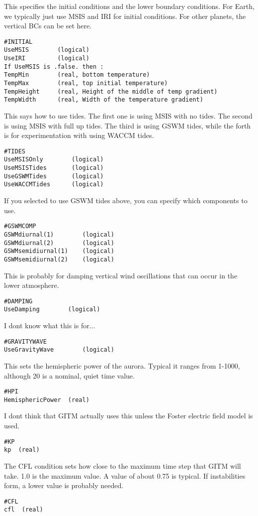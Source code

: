 This specifies the initial conditions and the
lower boundary conditions.  For Earth, we typically
just use MSIS and IRI for initial conditions.
For other planets, the vertical BCs can be set here.
\begin{verbatim}
#INITIAL
UseMSIS        (logical)
UseIRI         (logical)
If UseMSIS is .false. then :
TempMin        (real, bottom temperature)
TempMax        (real, top initial temperature)
TempHeight     (real, Height of the middle of temp gradient)
TempWidth      (real, Width of the temperature gradient)
\end{verbatim}

This says how to use tides.  The first one is using
MSIS with no tides.  The second is using MSIS with
full up tides. The third is using GSWM tides, while
the forth is for experimentation with using WACCM
tides.
\begin{verbatim}
#TIDES
UseMSISOnly        (logical)
UseMSISTides       (logical)
UseGSWMTides       (logical)
UseWACCMTides      (logical)
\end{verbatim}

If you selected to use GSWM tides above, you
can specify which components to use.
\begin{verbatim}
#GSWMCOMP
GSWMdiurnal(1)        (logical)
GSWMdiurnal(2)        (logical)
GSWMsemidiurnal(1)    (logical)
GSWMsemidiurnal(2)    (logical)
\end{verbatim}

This is probably for damping vertical wind
oscillations that can occur in the lower atmosphere.
\begin{verbatim}
#DAMPING
UseDamping        (logical)
\end{verbatim}

I dont know what this is for...
\begin{verbatim}
#GRAVITYWAVE
UseGravityWave        (logical)
\end{verbatim}

This sets the hemispheric power of the aurora.
Typical it ranges from 1-1000, although 20 is a
nominal, quiet time value.
\begin{verbatim}
#HPI
HemisphericPower  (real)
\end{verbatim}

I dont think that GITM actually uses this unless
the Foster electric field model is used.
\begin{verbatim}
#KP
kp  (real)
\end{verbatim}

The CFL condition sets how close to the maximum time
step that GITM will take.  1.0 is the maximum value.
A value of about 0.75 is typical.  If instabilities
form, a lower value is probably needed.
\begin{verbatim}
#CFL
cfl  (real)
\end{verbatim}

